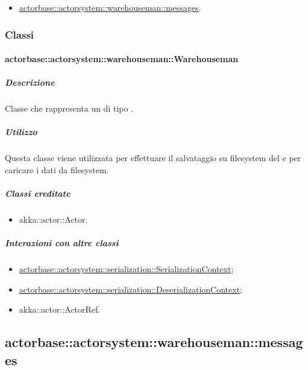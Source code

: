 \documentclass{scalatekids-article}
\begin{document}
\begin{itemize}

\item \hyperref[sec:actorbase::actorsystem::warehouseman::messages]{actorbase::actorsystem::warehouseman::messages}.

\end{itemize}

\subsubsection{Classi}

\paragraph{actorbase::actorsystem::warehouseman::Warehouseman}
\label{sec:actorbase::actorsystem::warehouseman::Warehouseman}

\subparagraph{Descrizione}

Classe che rappresenta un  di tipo .

\subparagraph{Utilizzo}

Questa classe viene utilizzata per effettuare il salvataggio su filesystem del
 e per caricare i dati da filesystem.

\subparagraph{Classi ereditate}

\begin{itemize}

\item akka::actor::Actor.

\end{itemize}

\subparagraph{Interazioni con altre classi}

\begin{itemize}
\item \hyperref[sec:actorbase::actorsystem::serialization::SerializationContext]{actorbase::actorsystem::serialization::SerializationContext};
\item \hyperref[sec:actorbase::actorsystem::serialization::DeserializationContext]{actorbase::actorsystem::serialization::DeserializationContext};
\item akka::actor::ActorRef.
\end{itemize}

\subsection{actorbase::actorsystem::warehouseman::messages}
\label{sec:actorbase::actorsystem::warehouseman::messages}
\end{document}
